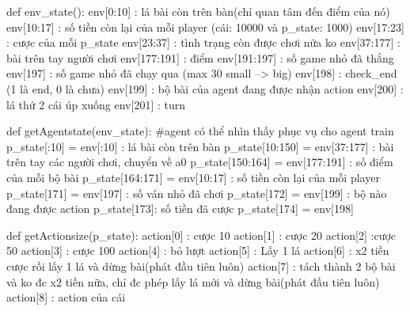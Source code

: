 def env_state():
    env[0:10] : lá bài còn trên bàn(chỉ quan tâm đến điểm của nó)
    env[10:17] : số tiền còn lại của mỗi player (cái: 10000 và p_state: 1000)
    env[17:23] : cược của mỗi p_state
    env[23:37] : tình trạng còn được chơi nữa ko
    env[37:177] : bài trên tay người chơi
    env[177:191] : điểm
    env[191:197] : số game nhỏ đã thắng
    env[197] : số game nhỏ đã chạy qua (max 30 small --> big)
    env[198] : check_end (1 là end, 0 là chưa)
    env[199] : bộ bài của agent đang được nhận action
    env[200] : lá thứ 2 cái úp xuống
    env[201] : turn

def getAgentstate(env_state): #agent có thể nhìn thấy phục vụ cho agent train
    p_state[:10] = env[:10] : lá bài còn trên bàn
    p_state[10:150] = env[37:177] : bài trên tay các người chơi, chuyển về a0
    p_state[150:164] = env[177:191] : số điểm của mỗi bộ bài
    p_state[164:171] = env[10:17] : số tiền còn lại của mỗi player
    p_state[171] = env[197] : số ván nhỏ đã chơi
    p_state[172] = env[199] : bộ nào đang được action
    p_state[173]: số tiền đã cược
    p_state[174] = env[198]


def getActionsize(p_state):
    action[0] : cược 10
    action[1] : cược 20
    action[2] :cược 50
    action[3] : cược 100
    action[4] : bỏ lượt
    action[5] : Lấy 1 lá
    action[6] : x2 tiền cược rồi lấy 1 lá và dừng bài(phát đầu tiên luôn)
    action[7] : tách thành 2 bộ bài và ko đc x2 tiền nữa, chỉ đc phép lấy lá mới và dừng bài(phát đầu tiên luôn)
    action[8] : action của cái

